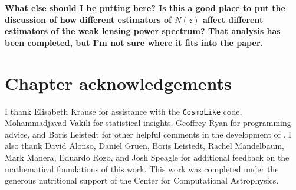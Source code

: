 \textbf{What else should I be putting here?  Is this a good place to put the discussion of how different estimators of $N(z)$ affect different estimators of the weak lensing power spectrum?  That analysis has been completed, but I'm not sure where it fits into the paper.}

\section{Chapter acknowledgements}

I thank Elisabeth Krause for assistance with the \texttt{CosmoLike} code, Mohammadjavad Vakili for statistical insights, Geoffrey Ryan for programming advice, and Boris Leistedt for other helpful comments in the development of \Chippr.
I also thank David Alonso, Daniel Gruen, Boris Leistedt, Rachel Mandelbaum, Mark Manera, Eduardo Rozo, and Josh Speagle for additional feedback on the mathematical foundations of this work.
This work was completed under the generous nutritional support of the Center for Computational Astrophysics.
